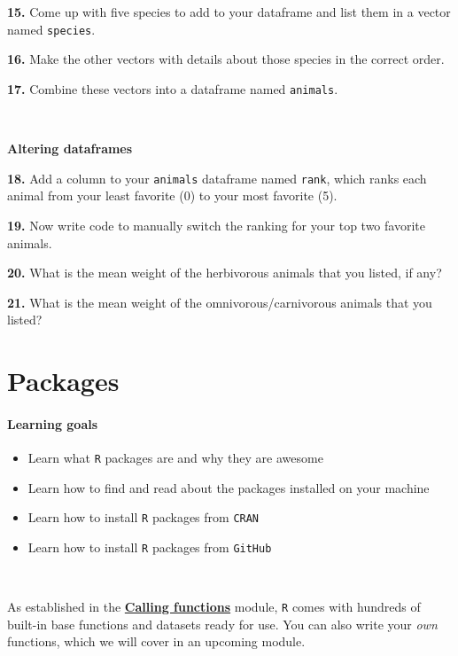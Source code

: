 \documentclass[
]{book}
\providecommand{\tightlist}{%
  \setlength{\itemsep}{0pt}\setlength{\parskip}{0pt}}
\begin{document}
\textbf{15.} Come up with five species to add to your dataframe and list them in a vector named \texttt{species}.

\textbf{16.} Make the other vectors with details about those species in the correct order.

\textbf{17.} Combine these vectors into a dataframe named \texttt{animals}.

~

\textbf{Altering dataframes}

\textbf{18.} Add a column to your \texttt{animals} dataframe named \texttt{rank}, which ranks each animal from your least favorite (0) to your most favorite (5).

\textbf{19.} Now write code to manually switch the ranking for your top two favorite animals.

\textbf{20.} What is the mean weight of the herbivorous animals that you listed, if any?

\textbf{21.} What is the mean weight of the omnivorous/carnivorous animals that you listed?

\chapter{Packages}\label{packages}

\subsubsection*{Learning goals}\label{learning-goals-7}

\begin{itemize}
\tightlist
\item
  Learn what \texttt{R} packages are and why they are awesome
\item
  Learn how to find and read about the packages installed on your machine
\item
  Learn how to install \texttt{R} packages from \texttt{CRAN}
\item
  Learn how to install \texttt{R} packages from \texttt{GitHub}
\end{itemize}

~

As established in the \hyperref[calling_functions]{\textbf{Calling functions}} module, \texttt{R} comes with hundreds of built-in base functions and datasets ready for use. You can also write your \emph{own} functions, which we will cover in an upcoming module.
\end{document}

